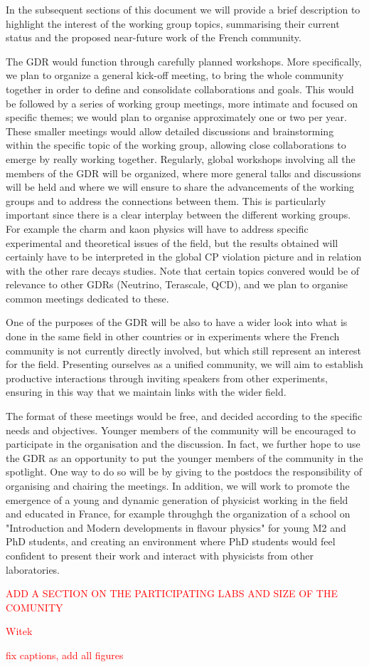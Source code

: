 In the subsequent sections of this document we will provide a brief description to highlight  the interest of the working group topics,  summarising their  current status and the proposed near-future work of the French community. 

The GDR would function through carefully planned workshops. More specifically, we plan to organize a general kick-off meeting, to bring the whole community together in order to define and consolidate collaborations and goals.  
This would be followed by a series of working group meetings, more intimate and focused on specific themes; we would plan to organise approximately one or two per year. These smaller meetings would allow detailed discussions and brainstorming within the specific topic of the working group, allowing close collaborations to emerge by really working together. Regularly, global workshops involving all the members of the GDR will be organized, where more general talks and discussions will be held and where we will ensure to share the advancements of the working groups and to address the connections between them. This is particularly important since there is a clear interplay  between the different working groups. For example the charm and kaon physics will have to address specific experimental and theoretical issues of the field, but the results obtained will certainly have to be interpreted in the global CP violation picture and in relation with the other rare decays studies.  Note that certain topics convered would be of relevance to other GDRs (Neutrino, Terascale, QCD), and we plan to organise common meetings dedicated to these.  

One of the purposes of the GDR will be also to have a wider look into what is done in the same field in other countries or in experiments where the French community is not currently directly involved, but which still represent an interest for the field. Presenting ourselves as a unified community, we will aim to establish productive interactions through inviting speakers from other experiments, ensuring in this way that we maintain links with the wider field. 

The format of these meetings would be free, and decided according to the specific needs and objectives.  Younger members of the community will be encouraged to participate in the organisation and the discussion. 
In fact, we further hope to use the GDR as an opportunity to put the younger members of the community in the spotlight. One way to do so will be  by giving to the postdocs the responsibility of organising and chairing the meetings. In addition, we will work to promote the emergence of a young and dynamic generation of physicist working in the field and educated in France, for example throughgh the organization of a school on "Introduction and Modern
developments in flavour physics" for young M2 and PhD students, and creating an environment where PhD students would feel confident to present their work and interact with physicists from other laboratories. 

\textcolor{red}{ADD A SECTION ON THE PARTICIPATING LABS AND SIZE OF THE COMUNITY}

\textcolor{red}{Witek}

\textcolor{red}{fix captions, add all figures}

